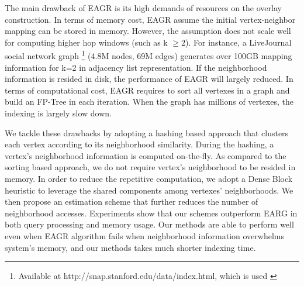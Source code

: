 The main drawback of EAGR is its high demands of resources 
on the overlay construction. In terms of memory cost, EAGR assume the 
initial vertex-neighbor mapping can be stored in memory. However, the assumption does not scale well for computing higher hop windows (such as k $\geq 2$). 
For instance, a LiveJournal social network graph \footnote{Available at http://snap.stanford.edu/data/index.html, which is used \cite{mondal2014eagr}} (4.8M nodes, 69M edges) generates over 100GB mapping information for k=2 in adjacency list 
representation. If the neighborhood information is resided in disk, the performance of EAGR will
largely reduced.  In terms of computational cost, EAGR requires to sort all vertexes 
in a graph and build an FP-Tree in each iteration. When the graph has
millions of vertexes, the indexing is largely slow down.


We tackle these drawbacks by adopting a hashing based approach that clusters each vertex according to
its neighborhood similarity. During the hashing, a vertex's neighborhood information
is computed on-the-fly. As compared to the sorting based approach, we do not require vertex's neighborhood
to be resided in memory. 
In order to reduce the repetitive computation, we adopt a Dense Block heuristic to leverage
the shared components among vertexes' neighborhoods. We then propose an estimation scheme that
further reduces the number of neighborhood accesses.
Experiments show that our schemes outperform EARG in both query processing and memory usage. 
Our methods are able to perform well even when EAGR algorithm fails when neighborhood information overwhelms system's memory, and our methods takes much shorter indexing time.
%
  

